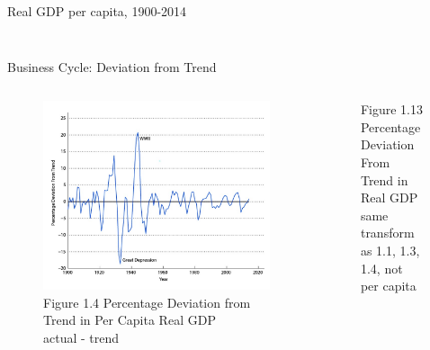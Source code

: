 \documentclass[11pt,aspectratio=43]{beamer}
\theoremstyle{definition}
\begin{document}
\begin{frame}{Real GDP per capita, 1900-2014}
\begin{columns}
\begin{column}{0.5\textwidth}
\begin{figure}
            \end{figure}
        \end{column}
    \end{columns}
\end{frame}

\begin{frame}{Business Cycle: Deviation from Trend}
\label{slide:Business_Cycle__Deviation_from_Trend}
    \begin{columns}
        \begin{column}{0.5\textwidth}
            \begin{figure}
                \caption{Figure 1.4 Percentage Deviation from Trend in Per Capita Real GDP \\ \alert{actual - trend}}
                \includegraphics[width=\textwidth]{./figures/Figure1_4.jpg}
            \end{figure}
        \end{column}
        \begin{column}{0.5\textwidth}
            \begin{figure}
                \caption{Figure 1.13 Percentage Deviation From Trend in Real GDP \\ \alert{same transform as 1.1, 1.3, 1.4, not per capita} }

\end{figure}
\end{column}
\end{columns}
\end{frame}
\end{document}
